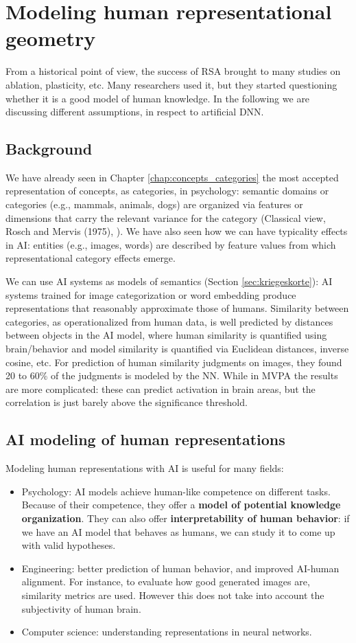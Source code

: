 \chapter{Modeling human representational geometry}
\label{chap:modeling_human}

From a historical point of view, the success of RSA brought to many studies on ablation, plasticity, etc. Many researchers used it, but they started questioning whether it is a good model of human knowledge. In the following we are discussing different assumptions, in respect to artificial DNN.

\section{Background}
We have already seen in Chapter \ref{chap:concepts_categories} the most accepted representation of concepts, as categories, in psychology: semantic domains or categories (e.g., mammals, animals, dogs) are organized via features or dimensions that carry the relevant variance for the category (Classical view, Rosch and Mervis (1975), \cite{lake-2015-deep}).
We have also seen how we can have typicality effects in AI: entities (e.g., images, words) are described by feature values from which representational category effects emerge.

We can use AI systems as models of semantics (Section \ref{sec:kriegeskorte}): AI systems trained for image categorization or word embedding produce representations that reasonably approximate those of humans. Similarity between categories, as operationalized from human data, is well predicted by distances between objects in the AI model, where human similarity is quantified using brain/behavior and model similarity is quantified via Euclidean distances, inverse cosine, etc.
For prediction of human similarity judgments on images, they found 20 to 60\% of the judgments is modeled by the NN. While in MVPA the results are more complicated: these can predict activation in brain areas, but the correlation is just barely above the significance threshold.

\section{AI modeling of human representations}
Modeling human representations with AI is useful for many fields:
\begin{itemize}
    \item Psychology: AI models achieve human-like competence on different tasks. Because of their competence, they offer a \textbf{model of potential knowledge organization}. They can also offer \textbf{interpretability of human behavior}: if we have an AI model that behaves as humans, we can study it to come up with valid hypotheses.
    \item Engineering: better prediction of human behavior, and improved AI-human alignment. For instance, to evaluate how good generated images are, similarity metrics are used. However this does not take into account the subjectivity of human brain.
    \item Computer science: understanding representations in neural networks.
\end{itemize}

